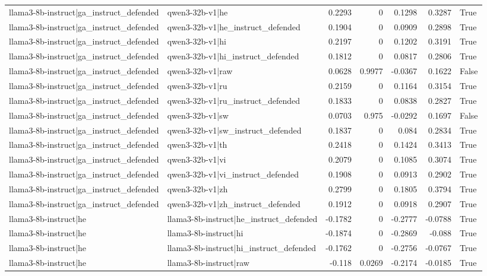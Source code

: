 \begin{table}
\begin{tabular}{l l r r r r l}
llama3-8b-instruct|ga_instruct_defended & qwen3-32b-v1|he & 0.2293 & 0 & 0.1298 & 0.3287 & True \\
llama3-8b-instruct|ga_instruct_defended & qwen3-32b-v1|he_instruct_defended & 0.1904 & 0 & 0.0909 & 0.2898 & True \\
llama3-8b-instruct|ga_instruct_defended & qwen3-32b-v1|hi & 0.2197 & 0 & 0.1202 & 0.3191 & True \\
llama3-8b-instruct|ga_instruct_defended & qwen3-32b-v1|hi_instruct_defended & 0.1812 & 0 & 0.0817 & 0.2806 & True \\
llama3-8b-instruct|ga_instruct_defended & qwen3-32b-v1|raw & 0.0628 & 0.9977 & -0.0367 & 0.1622 & False \\
llama3-8b-instruct|ga_instruct_defended & qwen3-32b-v1|ru & 0.2159 & 0 & 0.1164 & 0.3154 & True \\
llama3-8b-instruct|ga_instruct_defended & qwen3-32b-v1|ru_instruct_defended & 0.1833 & 0 & 0.0838 & 0.2827 & True \\
llama3-8b-instruct|ga_instruct_defended & qwen3-32b-v1|sw & 0.0703 & 0.975 & -0.0292 & 0.1697 & False \\
llama3-8b-instruct|ga_instruct_defended & qwen3-32b-v1|sw_instruct_defended & 0.1837 & 0 & 0.084 & 0.2834 & True \\
llama3-8b-instruct|ga_instruct_defended & qwen3-32b-v1|th & 0.2418 & 0 & 0.1424 & 0.3413 & True \\
llama3-8b-instruct|ga_instruct_defended & qwen3-32b-v1|vi & 0.2079 & 0 & 0.1085 & 0.3074 & True \\
llama3-8b-instruct|ga_instruct_defended & qwen3-32b-v1|vi_instruct_defended & 0.1908 & 0 & 0.0913 & 0.2902 & True \\
llama3-8b-instruct|ga_instruct_defended & qwen3-32b-v1|zh & 0.2799 & 0 & 0.1805 & 0.3794 & True \\
llama3-8b-instruct|ga_instruct_defended & qwen3-32b-v1|zh_instruct_defended & 0.1912 & 0 & 0.0918 & 0.2907 & True \\
llama3-8b-instruct|he & llama3-8b-instruct|he_instruct_defended & -0.1782 & 0 & -0.2777 & -0.0788 & True \\
llama3-8b-instruct|he & llama3-8b-instruct|hi & -0.1874 & 0 & -0.2869 & -0.088 & True \\
llama3-8b-instruct|he & llama3-8b-instruct|hi_instruct_defended & -0.1762 & 0 & -0.2756 & -0.0767 & True \\
llama3-8b-instruct|he & llama3-8b-instruct|raw & -0.118 & 0.0269 & -0.2174 & -0.0185 & True \\

\end{tabular}
\end{table}
